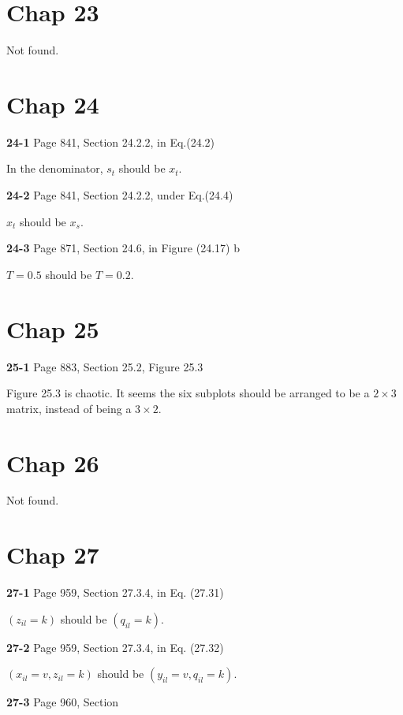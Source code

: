 \documentclass[aps,preprint,a4]{revtex4-1}
\begin{document}
\section{Chap 23}
Not found.




\section{Chap 24}
{\color{red}\textbf{24-1}} Page 841, Section 24.2.2, in Eq.(24.2)

In the denominator, $s_{t}$ should be $x_{t}$.

{\color{red}\textbf{24-2}} Page 841, Section 24.2.2, under Eq.(24.4)

$x_{t}$ should be $x_{s}$.

{\color{red}\textbf{24-3}} Page 871, Section 24.6, in Figure (24.17) b

$T = 0.5$ should be $T = 0.2$.


\section{Chap 25}
{\color{red}\textbf{25-1}} Page 883, Section 25.2, Figure 25.3

Figure 25.3 is chaotic. It seems the six subplots should be arranged to be a $2 \times 3$ matrix, instead of
being a $3 \times 2$.


\section{Chap 26}
Not found.




\section{Chap 27}
{\color{red}\textbf{27-1}} Page 959, Section 27.3.4, in Eq. (27.31)

$(z_{il}=k)$ should be $(q_{il}=k)$.

{\color{red}\textbf{27-2}} Page 959, Section 27.3.4, in Eq. (27.32) 

$(x_{il}=v, z_{il}=k)$ should be $(y_{il}=v, q_{il}=k)$.

{\color{red}\textbf{27-3}} Page 960, Section 
\end{document}
